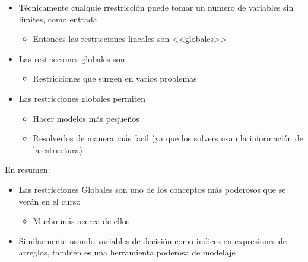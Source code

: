 \documentclass[12pt]{article}
\begin{document}
\begin{itemize}
\item Técnicamente cualquie rrestricción puede tomar un numero de variables sin limites, como entrada
\begin{itemize}
\item Entonces las restricciones lineales son <<globales>>
\end{itemize}
\item Las restricciones globales son
\begin{itemize}
\item Restricciones que surgen en varios problemas
\end{itemize}
\item Las restricciones globales permiten
\begin{itemize}
\item Hacer modelos más pequeños
\item Resolverlos de manera más facil (ya que los solvers usan la información de la estructura)
\end{itemize}
\end{itemize}

\begin{justify}
En resumen:
\end{justify}

\begin{itemize}
\item Las restricciones Globales son uno de los conceptos más poderosos que se verán en el curso
\begin{itemize}
\item Mucho más acerca de ellos
\end{itemize}
\item Similarmente usando variables de decisión como indices en expresiones de arreglos, también es una herramienta poderosa de modelaje
\end{itemize}
\end{document}
